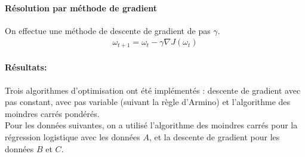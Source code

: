 \documentclass[paper=a4, fontsize=11pt]{article}
\begin{document}
\paragraph{Résolution par méthode de gradient\\}
On effectue une méthode de descente de gradient de pas $\gamma$.
\begin{align*}
\omega_{t+1} = \omega_{t} - \gamma \nabla J(\omega_{t})
\end{align*}

\paragraph{Résultats:\\}
Trois algorithmes d'optimisation ont été implémentés : descente de gradient avec pas constant, avec pas variable (suivant la règle d'Armino) et l'algorithme des moindres carrés pondérés. \\
Pour les données suivantes, on a utilisé l'algorithme des moindres carrés pour la régression logistique avec les données $A$, et la descente de gradient pour les données $B$ et $C$.\\
\end{document}

